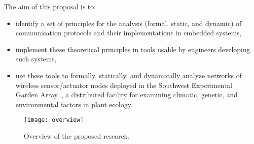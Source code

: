The aim of this proposal is to:
\begin{itemize}
\item identify a set of principles for the analysis (formal, static,
  and dynamic) of communication protocols and
  their implementations in embedded systems,
\item implement these theoretical principles in tools usable by
  engineers developing such systems,
\item use these tools to formally, statically, and dynamically analyze networks
  of wireless sensor/actuator nodes deployed in the Southwest Experimental Garden
  Array~\cite{YamEtAl10,FliEtAl12}, a distributed facility for
  examining climatic, genetic, and environmental factors in
  plant ecology.
\end{itemize}


\begin{figure}[!t]
  \centering
  \texttt{[image: overview]}
  \caption{Overview of the proposed research.}
  \label{fig:overview}
\end{figure}


